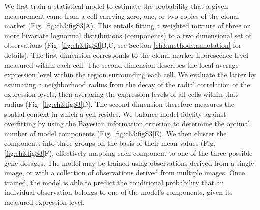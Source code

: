We first train a statistical model to estimate the probability that a given measurement came from a cell carrying zero, one, or two copies of the clonal marker (Fig. \ref{fig:ch3:figS3}A). This entails fitting a weighted mixture of three or more bivariate lognormal distributions (components) to a two dimensional set of observations (Fig. \ref{fig:ch3:figS3}B,C, see Section \ref{ch3:methods:annotation} for details). The first dimension corresponds to the clonal marker fluorescence level measured within each cell. The second dimension describes the local average expression level within the region surrounding each cell. We evaluate the latter by estimating a neighborhood radius from the decay of the radial correlation of the expression levels, then averaging the expression levels of all cells within that radius (Fig. \ref{fig:ch3:figS3}D). The second dimension therefore measures the spatial context in which a cell resides. We balance model fidelity against overfitting by using the Bayesian information criterion to determine the optimal number of model components (Fig. \ref{fig:ch3:figS3}E). We then cluster the components into three groups on the basis of their mean values (Fig. \ref{fig:ch3:figS3}F), effectively mapping each component to one of the three possible gene dosages. The model may be trained using observations derived from a single image, or with a collection of observations derived from multiple images. Once trained, the model is able to predict the conditional probability that an individual observation belongs to one of the model's components, given its measured expression level.

